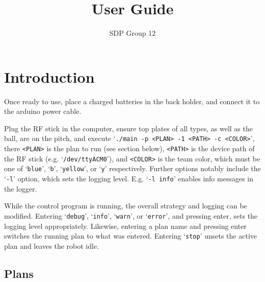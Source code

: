 \documentclass[12pt,a4paper]{article}
\author{SDP Group 12}
\title{User Guide}
\begin{document}
\maketitle




\section{Introduction}

Once ready to use, place a charged batteries in the back holder, and
connect it to the arduino power cable.

Plug the RF stick in the computer, ensure top plates of all types, as well as
the ball, are on the pitch, and execute
`\texttt{./main -p <PLAN> -1 <PATH> -c <COLOR>}', there \texttt{<PLAN>} is the
plan to run (see section below), \texttt{<PATH>} is the device path of the RF
stick (e.g. `\verb$/dev/ttyACM0$'), and \texttt{<COLOR>} is the team color,
which must be one of `\texttt{blue}', `\texttt{b}', `\texttt{yellow}', or
`\texttt{y}' respectively. Further options notably include the `\texttt{-l}'
option, which sets the logging level. E.g. `\texttt{-l info}' enables info
messages in the logger.

While the control program is running, the overall strategy and logging can be
modified. Entering `\texttt{debug}', `\texttt{info}', `\texttt{warn}', or
`\texttt{error}', and pressing enter, sets the logging level appropriately.
Likewise, entering a plan name and pressing enter switches the running plan to
what was entered. Entering `\texttt{stop}' unsets the active plan and leaves
the robot idle.

\subsection{Plans}
\end{document}
